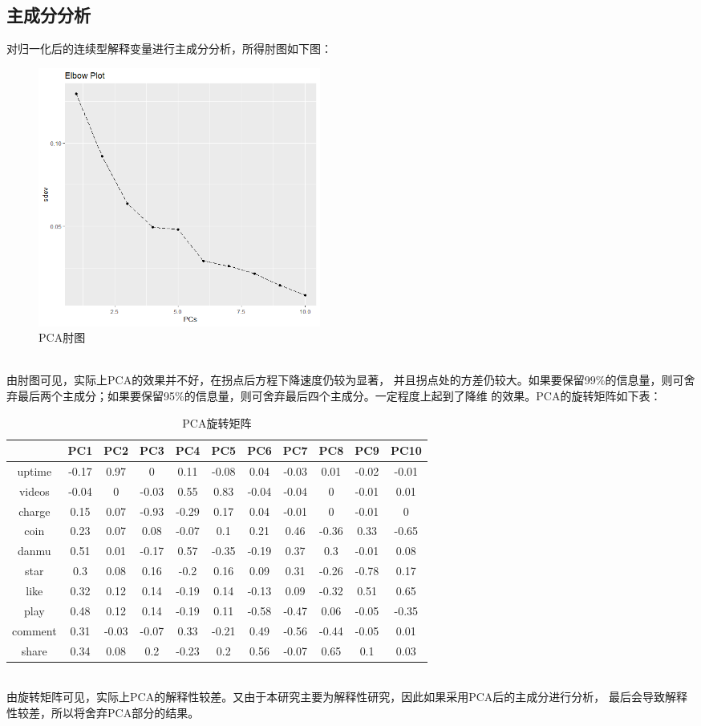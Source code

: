 \documentclass{ctexart}
\begin{document}
\subsection{主成分分析}
对归一化后的连续型解释变量进行主成分分析，所得肘图如下图：
\begin{figure}[htbp]
    \centering
    \includegraphics[width=0.45\textwidth]{EDA/PCA_elbow.png}
    \caption{PCA肘图}
\end{figure}\\
\indent 由肘图可见，实际上PCA的效果并不好，在拐点后方程下降速度仍较为显著，
并且拐点处的方差仍较大。如果要保留99\%的信息量，则可舍弃最后两个主成分；如果要保留95\%的信息量，则可舍弃最后四个主成分。一定程度上起到了降维
的效果。PCA的旋转矩阵如下表：
\begin{table}[htbp]
    \centering
    \begin{tabular}{|c|c|c|c|c|c|c|c|c|c|c|}
    \hline
            & PC1   & PC2   & PC3   & PC4   & PC5   & PC6   & PC7   & PC8   & PC9   & PC10  \\ \hline
    uptime  & -0.17 & 0.97  & 0     & 0.11  & -0.08 & 0.04  & -0.03 & 0.01  & -0.02 & -0.01 \\ \hline
    videos  & -0.04 & 0     & -0.03 & 0.55  & 0.83  & -0.04 & -0.04 & 0     & -0.01 & 0.01  \\ \hline
    charge  & 0.15  & 0.07  & -0.93 & -0.29 & 0.17  & 0.04  & -0.01 & 0     & -0.01 & 0     \\ \hline
    coin    & 0.23  & 0.07  & 0.08  & -0.07 & 0.1   & 0.21  & 0.46  & -0.36 & 0.33  & -0.65 \\ \hline
    danmu   & 0.51  & 0.01  & -0.17 & 0.57  & -0.35 & -0.19 & 0.37  & 0.3   & -0.01 & 0.08  \\ \hline
    star    & 0.3   & 0.08  & 0.16  & -0.2  & 0.16  & 0.09  & 0.31  & -0.26 & -0.78 & 0.17  \\ \hline
    like    & 0.32  & 0.12  & 0.14  & -0.19 & 0.14  & -0.13 & 0.09  & -0.32 & 0.51  & 0.65  \\ \hline
    play    & 0.48  & 0.12  & 0.14  & -0.19 & 0.11  & -0.58 & -0.47 & 0.06  & -0.05 & -0.35 \\ \hline
    comment & 0.31  & -0.03 & -0.07 & 0.33  & -0.21 & 0.49  & -0.56 & -0.44 & -0.05 & 0.01  \\ \hline
    share   & 0.34  & 0.08  & 0.2   & -0.23 & 0.2   & 0.56  & -0.07 & 0.65  & 0.1   & 0.03  \\ \hline
    \end{tabular}
    \caption{PCA旋转矩阵}
\end{table}\\
\indent 由旋转矩阵可见，实际上PCA的解释性较差。又由于本研究主要为解释性研究，因此如果采用PCA后的主成分进行分析，
最后会导致解释性较差，所以将舍弃PCA部分的结果。
\end{document}
